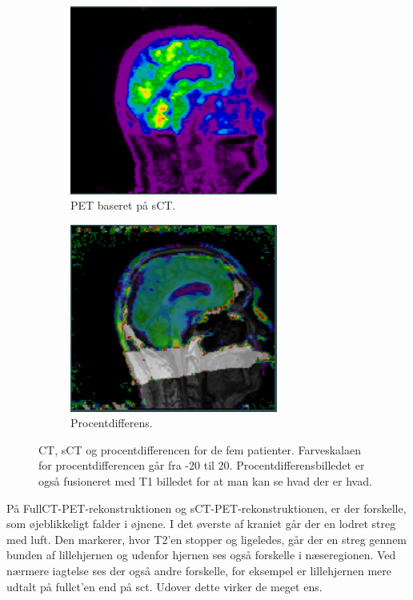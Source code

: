 \begin{figure}
\begin{subfigure}{0.3\textwidth}
        \includegraphics[width=0.75\textwidth]{colager/loocv_pet/loocv_011030_pet_sct.png}
        \caption{PET baseret på sCT.}
        \label{col:loocv_pet_pat5_sct}
    \end{subfigure}\hfill
    \begin{subfigure}{0.3\textwidth}
        \centering
        \includegraphics[width=0.75\textwidth]{colager/loocv_pet/loocv_011030_pet_pd.png}
        \caption{Procentdifferens.}
        \label{col:loocv_pet_pat5_pd}
    \end{subfigure}
    \caption{CT, sCT og procentdifferencen for de fem patienter. Farveskalaen for procentdifferencen går fra -20 til 20. Procentdifferensbilledet er også fusioneret med T1 billedet for at man kan se hvad der er hvad.}
    \label{col:loocv_pet}
\end{figure}

På FullCT-PET-rekonstruktionen og sCT-PET-rekonstruktionen, er der
forskelle, som øjeblikkeligt falder i øjnene. I det øverste af kraniet
går der en lodret streg med luft. Den markerer, hvor T2'en stopper
og ligeledes, går der en streg gennem bunden af lillehjernen og udenfor
hjernen ses også forskelle i næseregionen. Ved nærmere iagtelse ses
der også andre forskelle, for eksempel er lillehjernen mere udtalt på
fullct'en end på sct. Udover dette virker de meget ens.

